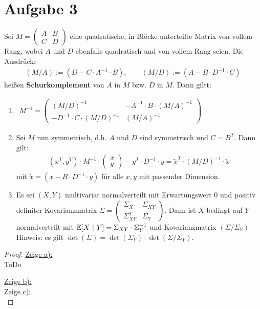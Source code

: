 \documentclass[12pt,a4paper]{article}
\begin{document}
\section*{Aufgabe 3}
Sei $M=\begin{pmatrix}
A & B\\ C & D
\end{pmatrix}$ eine quadratische, in Blöcke unterteilte Matrix von vollem Rang, wobei $A$ und $D$ ebenfalls quadratisch und von vollem Rang seien. Die Ausdrücke
\begin{align*}
(M/A):=\left(D-C\cdot A^{-1}\cdot B\right),\qquad(M/D):=\left(A-B\cdot D^{-1}\cdot C\right)
\end{align*}
heißen \textbf{Schurkomplement} von $A$ in $M$ bzw. $D$ in $M$. Dann giltt:
\begin{enumerate}[label=\alph*)]
\item $\begin{aligned}
M^{-1}=\begin{pmatrix}
(M/D)^{-1} & -A^{-1}\cdot B\cdot(M/A)^{-1}\\
-D^{-1}\cdot C\cdot(M/D)^{-1} & (M/A)^{-1}
\end{pmatrix}
\end{aligned}$
\item Sei $M$ nun symmetrisch, d.h. $A$ und $D$ sind symmetrisch und $C=B^T$. Dann gilt:
\begin{align*}
(x^T,y^T)\cdot M^{-1}\cdot\begin{pmatrix}
x\\y
\end{pmatrix}-y^T\cdot D^{-1}\cdot y=\tilde{x}^T\cdot(M/D)^{-1}\cdot\tilde{x}
\end{align*}
mit $\tilde{x}=\left(x-B\cdot D^{-1}\cdot y\right)$ für alle $x,y$ mit passender Dimension.
\item Es sei $(X,Y)$ multivariat normalverteilt mit Erwartungswert 0 und positiv definiter Kovarianzmatrix $\Sigma=\begin{pmatrix}
\Sigma_X & \Sigma_{XY}\\ \Sigma_{XY}^T & \Sigma_Y
\end{pmatrix}$. Dann ist $X$ bedingt auf $Y$ normalverteilt mit $\mathbb{E}[X~|~Y]=\Sigma_{XY}\cdot\Sigma_{Y}^{-1}$ und Kovarianzmatrix $(\Sigma/\Sigma_Y)$\\
Hinweis: es gilt $\det(\Sigma)=\det(\Sigma_Y)\cdot\det(\Sigma/\Sigma_Y)$.
\end{enumerate}
\begin{proof}
\underline{Zeige a):}\\ ToDo

\underline{Zeige b):}\\

\underline{Zeige c):}\\
\end{proof}
\end{document}
